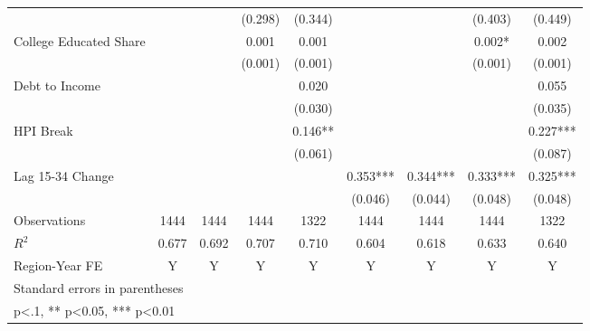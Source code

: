 \begin{table}[htbp]
\begin{tabular}{l*{8}{c}}
                    &            &            &  (0.298)   &  (0.344)   &            &            &  (0.403)   &  (0.449)   \\
\addlinespace
College Educated Share&            &            &    0.001   &    0.001   &            &            &    0.002*  &    0.002   \\
                    &            &            &  (0.001)   &  (0.001)   &            &            &  (0.001)   &  (0.001)   \\
\addlinespace
Debt to Income      &            &            &            &    0.020   &            &            &            &    0.055   \\
                    &            &            &            &  (0.030)   &            &            &            &  (0.035)   \\
\addlinespace
HPI Break           &            &            &            &    0.146** &            &            &            &    0.227***\\
                    &            &            &            &  (0.061)   &            &            &            &  (0.087)   \\
\addlinespace
Lag 15-34 Change    &            &            &            &            &    0.353***&    0.344***&    0.333***&    0.325***\\
                    &            &            &            &            &  (0.046)   &  (0.044)   &  (0.048)   &  (0.048)   \\
\midrule
Observations        &     1444   &     1444   &     1444   &     1322   &     1444   &     1444   &     1444   &     1322   \\
\(R^{2}\)           &    0.677   &    0.692   &    0.707   &    0.710   &    0.604   &    0.618   &    0.633   &    0.640   \\
Region-Year FE      &        Y   &        Y   &        Y   &        Y   &        Y   &        Y   &        Y   &        Y   \\
\bottomrule
\multicolumn{9}{l}{\footnotesize Standard errors in parentheses}\\
\multicolumn{9}{l}{\footnotesize * p<.1, ** p<0.05, *** p<0.01}\\
\end{tabular}
\end{table}
